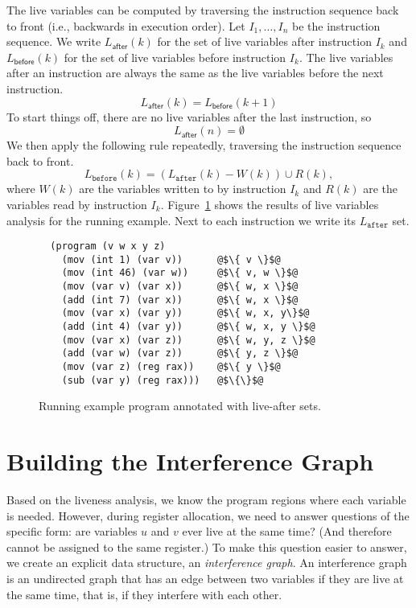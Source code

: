 \documentclass[12pt]{book}
\begin{document}
The live variables can be computed by traversing the instruction
sequence back to front (i.e., backwards in execution order).  Let
$I_1,\ldots, I_n$ be the instruction sequence. We write
$L_{\mathsf{after}}(k)$ for the set of live variables after
instruction $I_k$ and $L_{\mathsf{before}}(k)$ for the set of live
variables before instruction $I_k$. The live variables after an
instruction are always the same as the live variables before the next
instruction.
\begin{equation*}
  L_{\mathsf{after}}(k) = L_{\mathsf{before}}(k+1)
\end{equation*}
To start things off, there are no live variables after the last
instruction, so 
\begin{equation*}
  L_{\mathsf{after}}(n) = \emptyset 
\end{equation*}
We then apply the following rule repeatedly, traversing the
instruction sequence back to front.
\begin{equation*}
  L_{\mathtt{before}}(k) = (L_{\mathtt{after}}(k) - W(k)) \cup R(k),
\end{equation*}
where $W(k)$ are the variables written to by instruction $I_k$ and
$R(k)$ are the variables read by instruction $I_k$.
Figure~\ref{fig:live-eg} shows the results of live variables analysis
for the running example. Next to each instruction we write its
$L_{\mathtt{after}}$ set.

\begin{figure}[tbp]
\begin{lstlisting}
  (program (v w x y z)
    (mov (int 1) (var v))      @$\{ v \}$@
    (mov (int 46) (var w))     @$\{ v, w \}$@
    (mov (var v) (var x))      @$\{ w, x \}$@
    (add (int 7) (var x))      @$\{ w, x \}$@
    (mov (var x) (var y))      @$\{ w, x, y\}$@
    (add (int 4) (var y))      @$\{ w, x, y \}$@
    (mov (var x) (var z))      @$\{ w, y, z \}$@
    (add (var w) (var z))      @$\{ y, z \}$@
    (mov (var z) (reg rax))    @$\{ y \}$@
    (sub (var y) (reg rax)))   @$\{\}$@
\end{lstlisting}
\caption{Running example program annotated with live-after sets.}
\label{fig:live-eg}
\end{figure}


\section{Building the Interference Graph}

Based on the liveness analysis, we know the program regions where each
variable is needed.  However, during register allocation, we need to
answer questions of the specific form: are variables $u$ and $v$ ever
live at the same time?  (And therefore cannot be assigned to the same
register.)  To make this question easier to answer, we create an
explicit data structure, an \emph{interference graph}.  An
interference graph is an undirected graph that has an edge between two
variables if they are live at the same time, that is, if they
interfere with each other.
\end{document}
